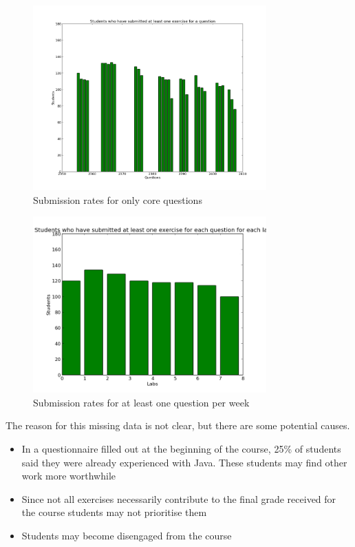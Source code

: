 \begin{figure}[h!]
\centering
\includegraphics[width=0.8\textwidth]{images/missing_data_core.png}
\caption{Submission rates for only core questions}
\label{fig:missing_data_core}
\end{figure}

\begin{figure}[h!]
\centering
\includegraphics[width=0.8\textwidth]{images/missing_data_week_any.png}
\caption{Submission rates for at least one question per week}
\label{fig:missing_data_week_any}
\end{figure}

The reason for this missing data is not clear, but there are some potential causes.

\begin{itemize}
\item In a questionnaire filled out at the beginning of the course, 25\% of students said they were already experienced with Java. These students may find other work more worthwhile
\item Since not all exercises necessarily contribute to the final grade received for the course students may not prioritise them
\item Students may become disengaged from the course
\end{itemize}

